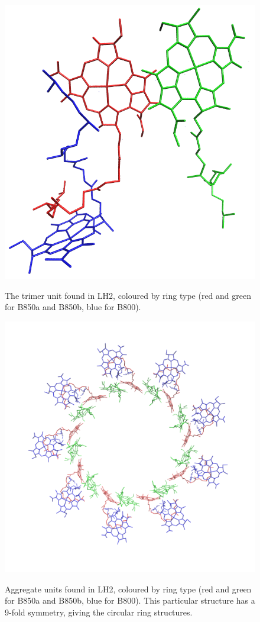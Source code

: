 \begin{figure}
	\centering 
	\includegraphics[scale=0.3]{chapters/1_introduction/subunit.png}
	\label{fig:LH2_subunit}
	\caption{The trimer unit found in LH2, coloured by ring type (red and green
	for B850a and B850b, blue for B800).}
\end{figure}

\begin{figure}
	\centering 
	\includegraphics[scale=0.3]{chapters/1_introduction/ring_assign.png}
	\label{fig:LH2_rings}
	\caption{Aggregate units found in LH2, coloured by ring type (red and green
	for B850a and B850b, blue for B800). This particular structure has a 9-fold
	symmetry, giving the circular ring structures.}
\end{figure}


